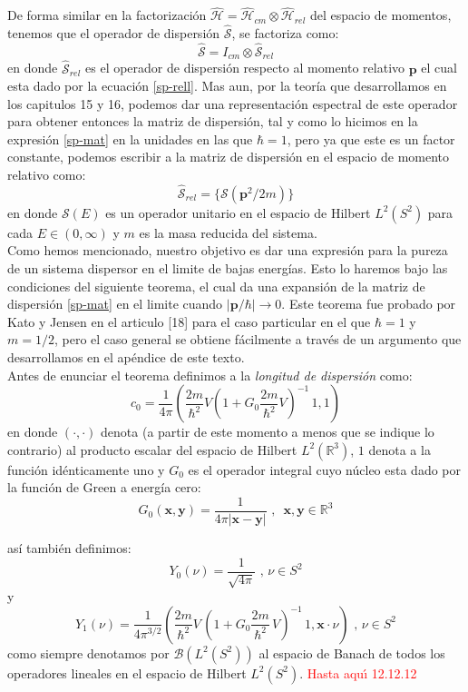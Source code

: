 \documentclass[12pt]{book}
\numberwithin{equation}{chapter}
\def\R{\mathbb{R}}
\def\S{\mathcal{S}}
\def\B{\mathcal{B}}
\def\rar{\rightarrow}
\def\H{\mathcal{H}}
\def\pr{\otimes}
\def\x{\mathbf{x}}
\def\y{\mathbf{y}}
\def\P{\mathbf{p}}
\begin{document}
De forma similar en la factorizaci\'on $\hat{\H}= \hat{\H}_{cm} \pr \hat{\H}_{rel}$ del espacio de momentos, tenemos que el operador de dispersi\'on $\hat{\S}$, se factoriza como:
$$ \hat{\S}= I_{cm} \pr \hat{\S}_{rel} $$
en donde $\hat{\S}_{rel}$ es el operador de dispersi\'on respecto al momento relativo $\P$ el cual esta dado por la ecuaci\'on \eqref{sp-rell}. Mas aun, por la teor\'ia que desarrollamos en los capitulos 15 y 16, podemos dar una representaci\'on espectral de este operador para obtener entonces la matriz de dispersi\'on, tal y como lo hicimos en la expresi\'on \eqref{sp-mat} en la unidades en las que $\hbar=1$, pero ya que este es un factor constante, podemos escribir a la matriz de dispersi\'on en el espacio de momento relativo como:
\begin{equation}\label{sp-mat}
\hat{\S}_{rel} =\{ \S( \P^{2}/2m ) \}
\end{equation}
en donde $\S(E)$ es un operador unitario en el espacio de Hilbert $L^{2}(S^{2})$ para cada $E \in (0 , \infty )$ y $m$ es la masa reducida del sistema.\\

Como hemos mencionado, nuestro objetivo es dar una expresi\'on para la pureza de un sistema dispersor en el limite de bajas energ\'ias. Esto lo haremos bajo las condiciones del siguiente teorema, el cual da una expansi\'on de la matriz de dispersi\'on \eqref{sp-mat} en el limite cuando $|\P/\hbar| \rar 0$. Este teorema fue probado por Kato y Jensen en el articulo [18] para el caso particular en el que $\hbar=1$ y $m=1/2$, pero el caso general se obtiene f\'acilmente a trav\'es de un argumento que desarrollamos en el ap\'endice de este texto.\\

Antes de enunciar el teorema definimos a la \emph{longitud de dispersi\'on} como:
\begin{equation}\label{scat-l}
c_{0}= \frac{1}{4\pi} \left(\frac{2m}{\hbar^{2}}V \left( 1+G_{0}\frac{2m}{\hbar^{2}}V \right)^{-1}\, 1 , 1   \right)
\end{equation}
en donde $( \cdot , \cdot )$ denota (a partir de este momento a menos que se indique lo contrario) al producto escalar del espacio de Hilbert $L^{2}(\R^{3})$, $1$ denota a la funci\'on id\'enticamente uno y $G_{0}$ es el operador integral cuyo n\'ucleo esta dado por la funci\'on de Green a energ\'ia cero:
$$ G_{0}(\x , \y )= \frac{1}{ 4\pi |\x - \y| } \,\,,\,\,\, \x ,\y \in \R^{3} $$

as\'i tambi\'en definimos:
\begin{equation}
Y_{0}(\nu) = \frac{1}{ \sqrt{4 \pi} } \,\,,\, \nu \in S^{2}
\end{equation}
y 
\begin{equation}
Y_{1}(\nu)= \frac{1}{4 \pi^{3/2}} \left(\frac{2m}{\hbar^{2}} V \, \left(1+G_{0}\frac{2m}{\hbar^{2}}\, V  \right)^{-1}\, 1, \x \cdot \nu \right) \,\,,\, \nu \in S^{2}
\end{equation}
como siempre denotamos por $\B(L^{2}(S^{2}))$ al espacio de Banach de todos los operadores lineales en el espacio de Hilbert $L^{2}(S^{2})$.
\textcolor{red}{Hasta aqu\'{\i} 12.12.12 } 
\end{document}
